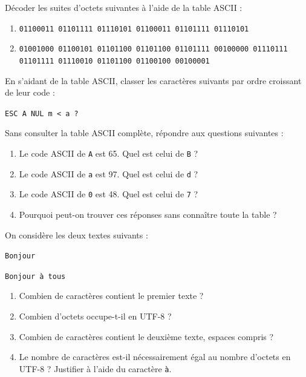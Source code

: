 \documentclass[11pt, a4paper]{book}
\begin{document}
\begin{exercice}
Décoder les suites d'octets suivantes à l'aide de la table ASCII :

\begin{enumerate}

\item
\texttt{01100011 01101111 01110101 01100011 01101111 01110101}

\item
\texttt{01001000 01100101 01101100 01101100 01101111
00100000 01110111 01101111 01110010 01101100 01100100
00100001}

\end{enumerate}
\end{exercice}


\begin{exercice}
En s'aidant de la table ASCII, classer les caractères suivants par ordre
croissant de leur code :

\begin{center}
\texttt{ESC \qquad A \qquad NUL \qquad m  \qquad < \qquad a \qquad ?}
\end{center}
\end{exercice}


\begin{exercice}
Sans consulter la table ASCII complète, répondre aux questions suivantes :

\begin{enumerate}
    \item Le code ASCII de \texttt{A} est 65. Quel est celui de \texttt{B} ?
    \item Le code ASCII de \texttt{a} est 97. Quel est celui de \texttt{d} ?
    \item Le code ASCII de \texttt{0} est 48. Quel est celui de \texttt{7} ?
    \item Pourquoi peut-on trouver ces réponses sans connaître toute la table ?
\end{enumerate}
\end{exercice}


\begin{exercice}
On considère les deux textes suivants :

\begin{center}
\texttt{Bonjour}

\medskip

\texttt{Bonjour à tous}
\end{center}

\begin{enumerate}
    \item Combien de caractères contient le premier texte ?
    \item Combien d'octets occupe-t-il en UTF-8 ?
    \item Combien de caractères contient le deuxième texte, espaces compris ?
    \item Le nombre de caractères est-il nécessairement égal au nombre
    d'octets en UTF-8 ? Justifier à l'aide du caractère \texttt{à}.
\end{enumerate}
\end{exercice}
\end{document}

